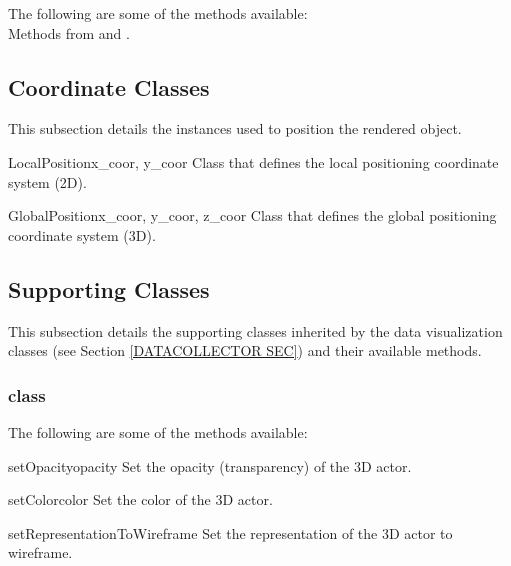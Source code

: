 The following are some of the methods available:\\
Methods from \ImageReslice and \ActorTwoD.




\subsection{Coordinate Classes}
This subsection details the instances used to position the rendered object.

\begin{classdesc}{LocalPosition}{x_coor, y_coor}
Class that defines the local positioning coordinate system (2D).
\end{classdesc}

\begin{classdesc}{GlobalPosition}{x_coor, y_coor, z_coor}
Class that defines the global positioning coordinate system (3D).
\end{classdesc}




\subsection{Supporting Classes}
This subsection details the supporting classes inherited by the data 
visualization classes (see Section \ref{DATACOLLECTOR SEC}) and their 
available methods. 

\subsubsection{\ActorThreeD class}

The following are some of the methods available:

\begin{methoddesc}[Actor3D]{setOpacity}{opacity}
Set the opacity (transparency) of the 3D actor.
\end{methoddesc}

\begin{methoddesc}[Actor3D]{setColor}{color}
Set the color of the 3D actor.
\end{methoddesc}

\begin{methoddesc}[Actor3D]{setRepresentationToWireframe}{}
Set the representation of the 3D actor to wireframe.
\end{methoddesc}

